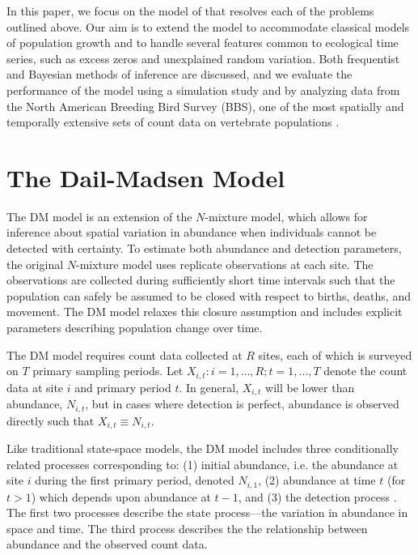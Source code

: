 \documentclass[12pt,english]{article}
\begin{document}
\begin{spacing}{1.9}
\begin{flushleft}
In this paper, we focus on the model of \citet[henceforth the DM model]{dail_madsen:2011}
that resolves each of the problems outlined above. 
Our aim is to extend the
model to accommodate classical models of population growth and
to handle several features common to ecological
time series, such as excess zeros and unexplained random variation. 
Both frequentist and Bayesian methods of inference are discussed, and
we evaluate the performance of the model using a simulation study and by
analyzing data from the North American Breeding Bird Survey (BBS), one of
the most spatially and temporally extensive sets of count data on
vertebrate populations \citep{robbins_etal:1986}.

\section*{The Dail-Madsen Model}
\label{sec:dm}

The DM model is an extension of the 
\citet{royle:2004biom} $N$-mixture model, which allows for inference about spatial
variation in abundance when individuals cannot be detected with
certainty. To estimate both abundance and detection parameters, 
the original $N$-mixture model uses replicate
observations at each site. The observations are collected during sufficiently
short time intervals such that the population can safely be
assumed to be closed with respect to births, deaths, and movement. The DM
model relaxes this closure assumption and includes explicit parameters
describing population change over time.

The DM model requires count data collected at $R$ sites, each of
which is surveyed on $T$ primary sampling periods. 
Let $X_{i,t}: i=1,\hdots,R; t=1,\hdots,T$ denote the count data
at site $i$ and primary period $t$. 
In general, $X_{i,t}$ will be lower than abundance, 
$N_{i,t}$, but in cases where detection is perfect,
abundance is observed directly such that $X_{i,t} \equiv N_{i,t}$.

Like traditional state-space models, the DM model includes 
three conditionally related processes corresponding to: 
(1) initial abundance, i.e. the
abundance at site $i$ during the first primary period,
denoted $N_{i,1}$, (2) abundance at time $t$ (for $t>1$) which depends upon
abundance at $t-1$, and (3) the
detection process \citep{dail_madsen:2011}.
The first two processes describe the state process---the
variation in abundance in space and time. The third process 
describes the the relationship between
abundance and the observed count data.


\end{flushleft}
\end{spacing}
\end{document}
